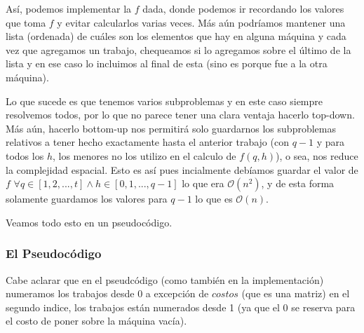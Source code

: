 \documentclass[A4paper,oneside,fleqn,11pt]{article}
\theoremstyle{definition}
\begin{document}
Así, podemos implementar la $f$ dada, donde podemos ir recordando los valores que toma $f$ y evitar calcularlos varias veces. Más aún podríamos mantener una lista (ordenada) de cuáles son los elementos que hay en alguna máquina y cada vez que agregamos un trabajo, chequeamos si lo agregamos sobre el último de la lista y en ese caso lo incluimos al final de esta (sino es porque fue a la otra máquina).

Lo que sucede es que tenemos varios subproblemas y en este caso siempre resolvemos todos, por lo que no parece tener una clara ventaja hacerlo top-down. Más aún, hacerlo bottom-up nos permitirá solo guardarnos los subproblemas relativos a tener hecho exactamente hasta el anterior trabajo (con $q-1$ y para todos los $h$, los menores no los utilizo en el calculo de $f(q,h)$), o sea, nos reduce la complejidad espacial. Esto es así pues incialmente debíamos guardar el valor de $f$ $\forall q \in [1,2,...,t] \land h \in [0,1,...,q-1]$ lo que era $\mathcal{O}(n^2)$, y de esta forma solamente guardamos los valores para $q-1$ lo que es $\mathcal{O}(n)$.

 Veamos todo esto en un pseudocódigo.
\subsubsection{El Pseudocódigo}

Cabe aclarar que en el pseudcódigo (como también en la implementación) numeramos los trabajos desde 0 a excepción de $costos$ (que es una matriz) en el segundo indice, los trabajos están numerados desde 1 (ya que el 0 se reserva para el costo de poner sobre la máquina vacía).
\end{document}
